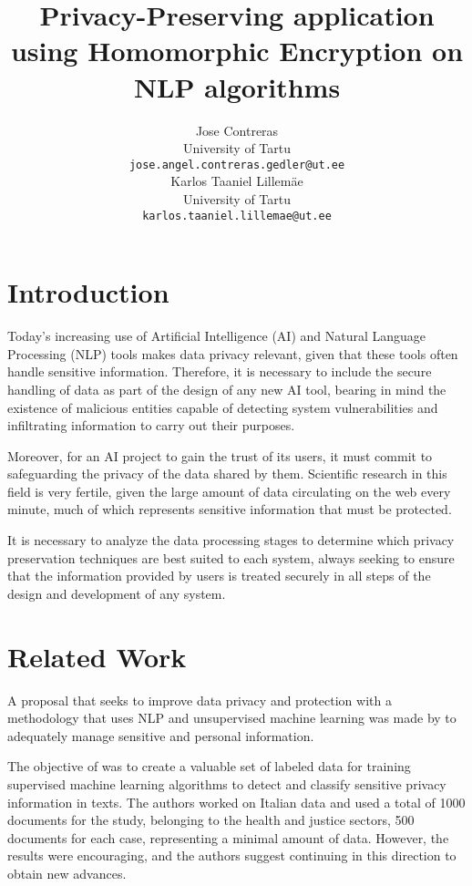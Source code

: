 \documentclass[11pt]{article}
\title{Privacy-Preserving application using Homomorphic Encryption on NLP algorithms}
\author{Jose Contreras \\
  University of Tartu \\
  \texttt{jose.angel.contreras.gedler@ut.ee} \\\And
  Karlos Taaniel Lillemäe \\
  University of Tartu \\
  \texttt{karlos.taaniel.lillemae@ut.ee} \\}
\begin{document}
\maketitle




\section{Introduction}
Today's increasing use of Artificial Intelligence (AI) and Natural Language Processing (NLP) tools makes data privacy relevant, given that these tools often handle sensitive information. Therefore, it is necessary to include the secure handling of data as part of the design of any new AI tool, bearing in mind the existence of malicious entities capable of detecting system vulnerabilities and infiltrating information to carry out their purposes.

Moreover, for an AI project to gain the trust of its users, it must commit to safeguarding the privacy of the data shared by them. Scientific research in this field is very fertile, given the large amount of data circulating on the web every minute, much of which represents sensitive information that must be protected.

It is necessary to analyze the data processing stages to determine which privacy preservation techniques are best suited to each system, always seeking to ensure that the information provided by users is treated securely in all steps of the design and development of any system.


\section{Related Work}

A proposal that seeks to improve data privacy and protection with a methodology that uses NLP and unsupervised machine learning was made by \cite{Martinelli2020} to adequately manage sensitive and personal information.

The objective of \cite{Martinelli2020} was to create a valuable set of labeled data for training supervised machine learning algorithms to detect and classify sensitive privacy information in texts. The authors worked on Italian data and used a total of 1000 documents for the study, belonging to the health and justice sectors, 500 documents for each case, representing a minimal amount of data. However, the results were encouraging, and the authors suggest continuing in this direction to obtain new advances.
\end{document}
